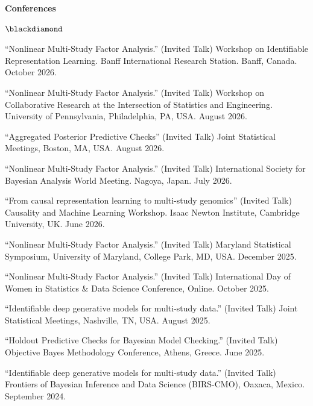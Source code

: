 \documentclass[margin,line]{res}
\newenvironment{list2}{
  \begin{list}{\footnotesize$\blackdiamond$}{%
      \setlength{\itemsep}{8pt}
      \setlength{\parsep}{2pt} \setlength{\parskip}{2pt}
      \setlength{\topsep}{2pt} \setlength{\partopsep}{2pt} 
      \setlength{\leftmargin}{0.2in}
      }}{\end{list}}
\begin{document}
\begin{resume}
{\bf Conferences}

\begin{list2}


\item ``Nonlinear Multi-Study Factor Analysis.'' (Invited Talk) Workshop on Identifiable Representation Learning. Banff International Research Station. Banff, Canada. October 2026.

\item ``Nonlinear Multi-Study Factor Analysis.'' (Invited Talk) Workshop on Collaborative Research at the Intersection of Statistics and Engineering. University of Pennsylvania, Philadelphia, PA, USA. August 2026.

\item ``Aggregated Posterior Predictive Checks'' (Invited Talk) Joint Statistical Meetings, Boston, MA, USA. August 2026.

\item ``Nonlinear Multi-Study Factor Analysis.'' (Invited Talk) International Society for Bayesian Analysis World Meeting. Nagoya, Japan. July 2026.

\item ``From causal representation learning to multi-study genomics'' (Invited Talk) Causality and Machine Learning Workshop. Isaac Newton Institute, Cambridge University, UK. June 2026.


\item ``Nonlinear Multi-Study Factor Analysis.'' (Invited Talk) Maryland Statistical Symposium, University of Maryland, College Park, MD, USA. December 2025.

\item ``Nonlinear Multi-Study Factor Analysis.'' (Invited Talk) International Day of Women in Statistics \& Data Science Conference, Online. October 2025.

\item ``Identifiable deep generative models for multi-study data.'' (Invited Talk) Joint Statistical Meetings, Nashville, TN, USA. August 2025. 

\item ``Holdout Predictive Checks for Bayesian Model Checking.'' (Invited Talk) Objective Bayes Methodology Conference, Athens, Greece. June 2025. 


\item ``Identifiable deep generative models for multi-study data.'' (Invited Talk) Frontiers of Bayesian Inference and Data Science (BIRS-CMO), Oaxaca, Mexico. September 2024. 


\end{list2}
\end{resume}
\end{document}
